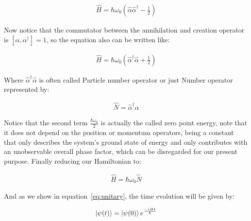 \documentclass[
  journal=largetwo,
  year=2023,
]{cup-journal}
\begin{document}
\begin{equation}
  \begin{aligned}\label{eq:10}
    \hat{H} = \hbar\omega_0(\hat{\alpha}\hat{\alpha}^{\dag} - \frac{1}{2})
  \end{aligned}
\end{equation}


Now notice that the commutator between the annihilation and creation operator is \([\alpha, \alpha^{\dag}] = 1\), so the equation also can be written like:

\begin{equation}
  \begin{aligned}\label{eq:10}
    \hat{H} = \hbar\omega_0(\hat{\alpha}^{\dag}\hat{\alpha} + \frac{1}{2})
  \end{aligned}
\end{equation}


Where \(\hat{\alpha}^{\dag}\hat{\alpha}\) is often called Particle number operator or just Number operator represented by:

\begin{equation}
  \begin{aligned}\label{eq:10}
    \hat{N} = \hat{\alpha}^{\dag}\hat{\alpha}
  \end{aligned}
\end{equation}


Notice that the second term \(\frac{\hbar\omega_0}{2}\) is actually the called zero point energy, note that it does not depend on the position or momentum operators, being a constant that only describes the system's ground state of energy and only contributes with an unobservable overall phase factor, which can be disregarded for our present purpose. Finally reducing our Hamiltonian to:

\begin{equation}
  \begin{aligned}\label{eq:11}
    \hat{H} = \hbar\omega_0\hat{N}
  \end{aligned}
\end{equation}


And as we show in equation~\ref{eq:unitary}, the time evolution will be given by:

\begin{equation}
  \begin{aligned}\label{eq:12}
    \ket{\psi(t)} = \ket{\psi(0)}e^{\frac{-iHt}{\hbar}}
  \end{aligned}
\end{equation}
\end{document}
